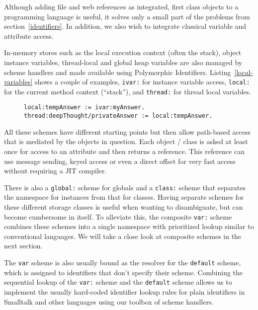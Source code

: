 \documentclass[preprint,authoryear]{llncs}
\begin{document}
Although adding file and web references as integrated, first class objects to a programming
language is useful, it solves only a small part of the problems from section~\ref{identifiers}.
In addition, we also wish to integrate classical variable and attribute access.

In-memory stores such as the local execution context (often the stack), object instance
variables, thread-local and global heap variables are also managed by scheme handlers
and made available using Polymorphic Identifiers.  Listing~\ref{local-variables} shows
a couple of examples, {\tt ivar:} for instance variable access, {\tt local:} for the current
method context (``stack''), and {\tt thread:} for thread local variables.

\begin{figure}[htbp]
\begin{lstlisting}[style=numbers,label=local-variables,caption=Different memory variables.]
local:tempAnswer := ivar:myAnswer.
thread:deepThought/privateAnswer := local:tempAnswer.
\end{lstlisting}
\end{figure}

All these schemes have different starting points but then allow path-based access
that is mediated by the objects in question.   Each object / class is asked at least
once for access to an attribute and then returns a reference.   This reference can
use message sending, keyed access or even a direct offset for very fast
access without requiring a JIT compiler.

There is also a {\tt global:} scheme for globals and a {\tt class:} scheme that separates
the namespace for instances from that for classes.  Having separate schemes for
these different storage classes is useful when wanting to disambiguate,
but can become cumbersome in itself.  To alleviate this, the composite
{\tt var:} scheme combines these schemes into a single namespace
with prioritized lookup similar to conventional languages.  We will take
a close look at composite schemes in the next section.  

The {\tt var} scheme is also usually bound as the resolver for the {\tt default}
scheme, which is assigned to identifiers that don't specify their scheme.
Combining the sequential lookup of the {\tt var:} scheme and the {\tt default}
scheme allows us to implement the usually hard-coded identifier lookup
rules for plain identifiers in Smalltalk and other languages using
our toolbox of scheme handlers.
\end{document}
